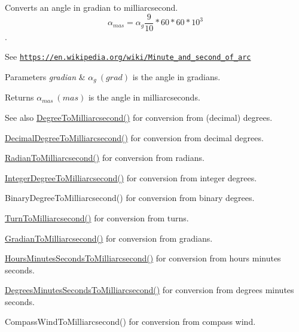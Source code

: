 Converts an angle in gradian to milliarcsecond. \[\alpha_{mas}=\alpha_{g}\frac{9}{10} * 60 * 60 * 10^3\]. 

See \href{https://en.wikipedia.org/wiki/Minute_and_second_of_arc}{\tt https\+://en.\+wikipedia.\+org/wiki/\+Minute\+\_\+and\+\_\+second\+\_\+of\+\_\+arc} 
\begin{DoxyParams}{Parameters}
{\em gradian} & $\alpha_{g}\ (grad)$ is the angle in gradians. \\
\hline
\end{DoxyParams}
\begin{DoxyReturn}{Returns}
$\alpha_{mas}\ (mas)$ is the angle in milliarcseconds. 
\end{DoxyReturn}
\begin{DoxySeeAlso}{See also}
\mbox{\hyperlink{group___e_g_x_math-_angle_conversions-_degree_ga2c218e286b2ef72a00734dbc5a7f5ab6}{Degree\+To\+Milliarcsecond()}} for conversion from (decimal) degrees. 

\mbox{\hyperlink{group___e_g_x_math-_angle_conversions-_decimal_degree_gadb9ff3c92cf7484793f91e7de80c222e}{Decimal\+Degree\+To\+Milliarcsecond()}} for conversion from decimal degrees. 

\mbox{\hyperlink{group___e_g_x_math-_angle_conversions-_radian_ga84fbb494a455cfeb30be62776f96c9a9}{Radian\+To\+Milliarcsecond()}} for conversion from radians. 

\mbox{\hyperlink{group___e_g_x_math-_angle_conversions-_integer_degree_gadc43f22e832cd8fcf16b7bd2269ae348}{Integer\+Degree\+To\+Milliarcsecond()}} for conversion from integer degrees. 

Binary\+Degree\+To\+Milliarcsecond() for conversion from binary degrees. 

\mbox{\hyperlink{group___e_g_x_math-_angle_conversions-_turn_ga05d6fea8f8475831e93dd23f6196393f}{Turn\+To\+Milliarcsecond()}} for conversion from turns. 

\mbox{\hyperlink{group___e_g_x_math-_angle_conversions-_gradian_gad77ea0956413029f4166dce8d7f5ce83}{Gradian\+To\+Milliarcsecond()}} for conversion from gradians. 

\mbox{\hyperlink{group___e_g_x_math-_angle_conversions-_hours_minutes_seconds_gaf63c3ba5f75aacd268db2814575fa3f9}{Hours\+Minutes\+Seconds\+To\+Milliarcsecond()}} for conversion from hours minutes seconds. 

\mbox{\hyperlink{group___e_g_x_math-_angle_conversions-_degrees_minutes_seconds_gafc5f994dfc7cc26500ca978336484926}{Degrees\+Minutes\+Seconds\+To\+Milliarcsecond()}} for conversion from degrees minutes seconds. 

Compass\+Wind\+To\+Milliarcsecond() for conversion from compass wind. 
\end{DoxySeeAlso}
\mbox{\label{group___e_g_x_math-_angle_conversions-_gradian_ga144f1019dc760268a163d81fcb3ce482}} 
